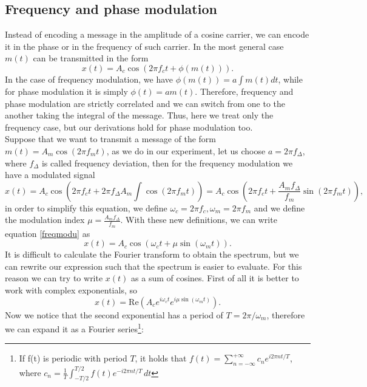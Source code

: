 \documentclass[a4paper,10pt]{article}
\begin{document}
\subsection{Frequency and phase modulation}
Instead of encoding a message in the amplitude of a cosine carrier, we can encode it in the phase or in the frequency of such carrier. In the most general case $m(t)$ can be transmitted in the form
\begin{equation}x(t) = A_c \cos(2\pi f_ct + \phi(m(t))).\end{equation}
In the case of frequency modulation, we have $\phi(m(t))= a \int m(t)dt$, while for phase modulation it is simply $\phi(t) = a m(t)$. Therefore, frequency and phase modulation are strictly correlated and we can switch from one to the another taking the integral of the message. Thus, here we treat only the frequency case, but our derivations hold for phase modulation too. \\
Suppose that we want to transmit a message of the form $m(t) = A_m \cos (2\pi f_mt)$, as we do in our experiment, let us choose $a = 2\pi f_\Delta$, where $f_\Delta$ is called frequency deviation, then for the frequency modulation we have a modulated signal
\begin{equation}\label{freqmodu}x(t) = A_c \cos\left(2\pi f_ct + 2\pi f_\Delta A_m \int \cos (2\pi f_mt)\right) =  A_c \cos\left(2\pi f_ct + \frac{A_m f_\Delta }{f_m }\sin (2\pi f_mt)\right), \end{equation}
in order to simplify this equation, we define $\omega_c = 2\pi f_c,\omega_m = 2\pi f_m$ and we define the modulation index $\mu = \displaystyle\frac{A_m f_\Delta }{f_m }$. With these new definitions, we can write equation \eqref{freqmodu} as
\begin{equation}x(t) =  A_c \cos\left(\omega_ct + \mu\sin (\omega_mt)\right).\end{equation}
It is difficult to calculate the Fourier transform to obtain the spectrum, but we can rewrite our expression such that the spectrum is easier to evaluate. For this reason we can try to write $x(t)$ as a sum of cosines. First of all it is better to work with complex exponentials, so
\begin{equation}\label{complexform}x(t) = \text{Re}\left(A_c e^{i\omega_c t}e^{i\mu \sin(\omega_m t)}\right).\end{equation}
Now we notice that the second exponential has a period of $T = 2\pi/\omega_m$, therefore we can expand it as a Fourier series\footnote{If f(t) is periodic with period $T$, it holds that $f(t) = \displaystyle\sum_{n=-\infty}^{+\infty} c_n e^{i2\pi n t/T}$, where $c_n = \frac{1}{T}\displaystyle\int_{-T/2}^{T/2}f(t)e^{-i2\pi n t/T}\,dt$}:
\end{document}
